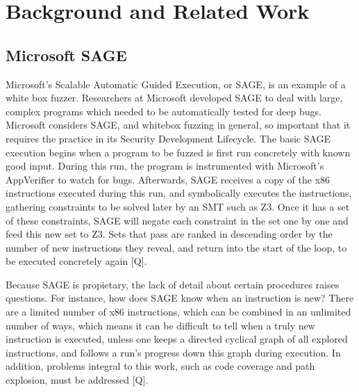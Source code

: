 \documentclass[11pt,expanded,copyright]{fsuthesis}
\begin{document}
\chapter{Background and Related Work}




\section{Microsoft SAGE}

Microsoft's Scalable Automatic Guided Execution, or SAGE, is an example of a white box fuzzer. Researchers at Microsoft developed SAGE to deal with large, complex programs which needed to be automatically tested for deep bugs. Microsoft considers SAGE, and whitebox fuzzing in general, so important that it requires the practice in its Security Development Lifecycle. The basic SAGE execution begins when a program to be fuzzed is first run concretely with known good input. During this run, the program is instrumented with Microsoft's AppVerifier to watch for bugs. Afterwards, SAGE receives a copy of the x86 instructions executed during this run, and symbolically executes the instructions, gathering constraints to be solved later by an SMT such as Z3. Once it has a set of these constraints, SAGE will negate each constraint in the set one by one and feed this new set to Z3. Sets that pass are ranked in descending order by the number of new instructions they reveal, and return into the start of the loop, to be executed concretely again [Q].

Because SAGE is propietary, the lack of detail about certain procedures raises questions. For instance, how does SAGE know when an instruction is new? There are a limited number of x86 instructions, which can be combined in an unlimited number of ways, which means it can be difficult to tell when a truly new instruction is executed, unless one keeps a directed cyclical graph of all explored instructions, and follows a run's progress down this graph during execution. In addition, problems integral to this work, such as code coverage and path explosion, must be addressed [Q].
\end{document}
